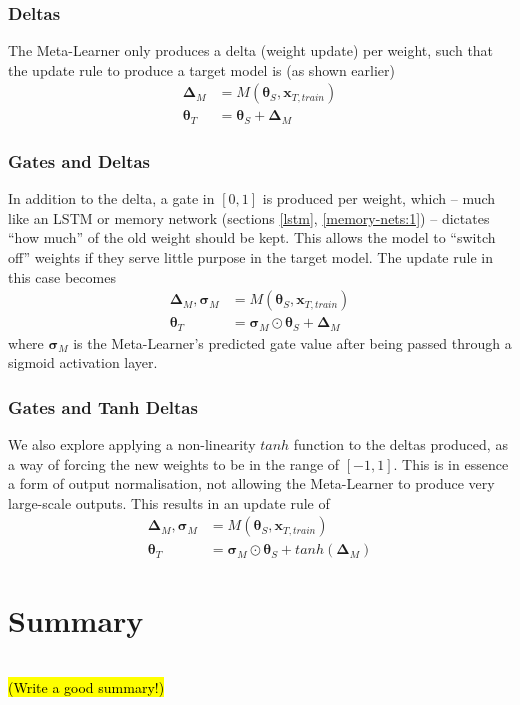 \documentclass{report}
\newcommand{\TODO}[1]{\sethlcolor{pink}\hl{\\(#1)\\}}
\begin{document}
\subsubsection{Deltas}
The Meta-Learner only produces a delta (weight update) per weight, such that the update rule to produce a target model is (as shown earlier)
\begin{align}
\bm{\Delta}_M &= M(\bm{\theta}_S, \bm{x}_{T,train}) \\
\bm{\theta}_T &= \bm{\theta}_S + \bm{\Delta}_M
\end{align}


\subsubsection{Gates and Deltas}
In addition to the delta, a gate in $[0, 1]$ is produced per weight, which -- much like an LSTM or memory network (sections \ref{lstm}, \ref{memory-nets:1}) -- dictates ``how much'' of the old weight should be kept. This allows the model to ``switch off'' weights if they serve little purpose in the target model. The update rule in this case becomes
\begin{align}
\bm{\Delta}_M, \bm{\sigma}_M &= M(\bm{\theta}_S, \bm{x}_{T,train}) \\
\bm{\theta}_T &= \bm{\sigma}_M \odot \bm{\theta}_S + \bm{\Delta}_M
\end{align}
where $\bm{\sigma}_M$ is the Meta-Learner's predicted gate value after being passed through a sigmoid activation layer.


\subsubsection{Gates and Tanh Deltas}
We also explore applying a non-linearity $tanh$ function to the deltas produced, as a way of forcing the new weights to be in the range of $[-1, 1]$. This is in essence a form of output normalisation, not allowing the Meta-Learner to produce very large-scale outputs. This results in an update rule of
\begin{align}
\bm{\Delta}_M, \bm{\sigma}_M &= M(\bm{\theta}_S, \bm{x}_{T,train}) \\
\bm{\theta}_T &= \bm{\sigma}_M \odot \bm{\theta}_S + tanh(\bm{\Delta}_M)
\end{align}

\section{Summary}
\TODO{Write a good summary!}
\end{document}

